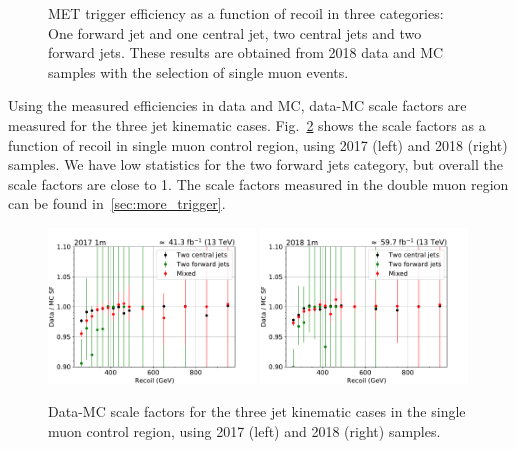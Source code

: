\begin{figure}[hbp]
\begin{center}
    \end{center}
    \caption{MET trigger efficiency as a function of recoil in three categories: One forward jet and one central jet, two central jets and
            two forward jets. These results are obtained from 2018 data and MC samples with the selection of single muon events.}
    \label{fig:eff_recoil_2018_1m}
\end{figure}

Using the measured efficiencies in data and MC, data-MC scale factors are measured for the three jet kinematic cases. 
Fig.~\ref{fig:sf_recoil_1m} shows the scale factors as a function of recoil in single muon control region, using 2017 (left)
and 2018 (right) samples. We have low statistics for the two forward jets category, but overall the scale factors are close to 1.
The scale factors measured in the double muon region can be found in~\ref{sec:more_trigger}.

\begin{figure}[htbp]
    \begin{center}
        \includegraphics[width=0.49\textwidth]{fig/efficiency/trigger/met/recoil/scale_factors_1m_2017.pdf}
        \includegraphics[width=0.49\textwidth]{fig/efficiency/trigger/met/recoil/scale_factors_1m_2018.pdf} 
    \end{center}
    \caption{Data-MC scale factors for the three jet kinematic cases in the single muon control region, using 2017 (left) and 2018 (right) samples.}
    \label{fig:sf_recoil_1m}
\end{figure}

